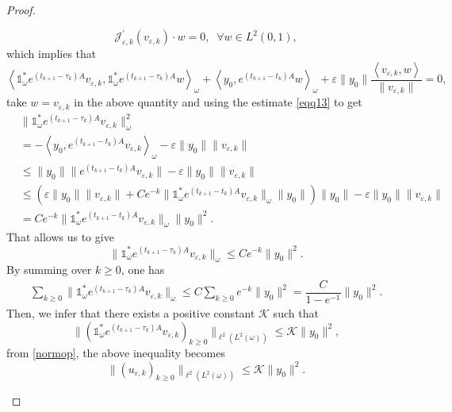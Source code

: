 \documentclass[sn-mathphys]{sn-jnl}
\begin{document}
\begin{proof}
\begin{enumerate}
    \[\mathcal{J}^{'}_{\varepsilon,k} (v_{\varepsilon,k}) \cdot w =0, \;\;\forall w \in L^2(0,1),\]
    which implies that
    \[\left\langle \mathds{1}^{*}_{\omega} e^{(t_{k+1}-\tau_k)A} v_{\varepsilon,k}, \mathds{1}^{*}_{\omega} e^{(t_{k+1}-\tau_k)A} w \right\rangle_{\omega} + \left\langle y_0 , e^{(t_{k+1}-t_k)A} w \right\rangle_{\omega} + \varepsilon \|y_0\|\dfrac{\left\langle v_{\varepsilon,k} , w \right\rangle}{\| v_{\varepsilon,k} \|} =0,\]
    take $w=v_{\varepsilon,k}$ in the above quantity and using the estimate \eqref{eqq13} to get
    \begin{align}\label{eqq9}
       & \| \mathds{1}^{*}_{\omega} e^{(t_{k+1}-\tau_k)A} v_{\varepsilon,k} \|_{\omega}^2\nonumber\\
        &= - \left\langle y_0 , e^{(t_{k+1}-t_k)A} v_{\varepsilon,k} \right\rangle_{\omega} - \varepsilon \|y_0\| \| v_{\varepsilon,k} \|\nonumber\\
        &\leq \| y_0 \| \| e^{(t_{k+1}-t_k)A} v_{\varepsilon,k} \| - \varepsilon \|y_0\| \| v_{\varepsilon,k} \|\nonumber\\
        &\leq \left( \varepsilon \|y_0\| \| v_{\varepsilon,k} \| + C e^{-k} \| \mathds{1}^{*}_{\omega} e^{(t_{k+1}-t_k)A} v_{\varepsilon,k} \|_{\omega} \| y_0 \| \right) \| y_0\| - \varepsilon \|y_0\|\| v_{\varepsilon,k} \|\nonumber\\
        &=C e^{-k} \| \mathds{1}^{*}_{\omega} e^{(t_{k+1}-t_k)A} v_{\varepsilon,k} \|_{\omega} \| y_0 \|^2.
    \end{align}
    That allows us to give
    \[\| \mathds{1}^{*}_{\omega} e^{(t_{k+1}-\tau_k)A} v_{\varepsilon,k} \|_{\omega} \leq C e^{-k} \| y_0 \|^2.\]
    By summing over $k \geq 0$, one has
    \begin{align*}
        \sum_{k \geq 0} \| \mathds{1}^{*}_{\omega} e^{(t_{k+1}-\tau_k)A} v_{\varepsilon,k} \|_{\omega} 
        \leq C \sum_{k \geq 0} e^{-k} \| y_0 \|^2
        =\dfrac{C}{1-e^{-1}} \| y_0\|^2.
    \end{align*}
   Then, we infer that there exists a positive constant $\mathcal{K}$ such that
   \begin{equation*}
       \| (\mathds{1}^{*}_{\omega} e^{(t_{k+1}-\tau_k)A} v_{\varepsilon,k})_{k \geq 0} \|_{\ell^2(L^2(\omega))} \leq \mathcal{K} \| y_0\|^2, 
   \end{equation*}
   from \eqref{normop}, the above inequality becomes
   \begin{equation}\label{eqq10}
       \| ( u_{\varepsilon,k})_{k \geq 0} \|_{\ell^2(L^2(\omega))} \leq \mathcal{K} \| y_0\|^2.

\end{equation}
\end{enumerate}
\end{proof}
\end{document}
